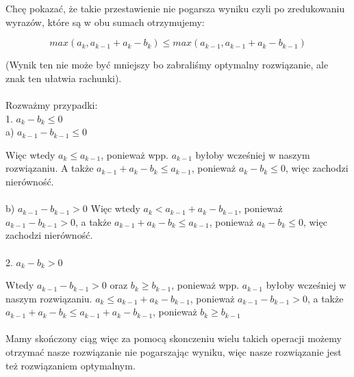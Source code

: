 \documentclass{article}
\begin{document}
Chcę pokazać, że takie przestawienie nie pogarsza wyniku czyli po zredukowaniu wyrazów, które są w obu sumach otrzymujemy:

$$ max(a_{k}, a_{k-1} + a_{k} - b_{k}) \leq max(a_{k-1}, a_{k-1} + a_{k} - b_{k-1}) $$

(Wynik ten nie może być mniejszy bo zabraliśmy optymalny rozwiązanie, ale znak ten ułatwia rachunki).\\ \\
Rozważmy przypadki:\\
1. $a_{k} - b_{k} \leq 0$ \\

a) $a_{k-1} - b_{k-1} \leq 0$

    Więc wtedy $a_{k} \leq a_{k-1}$, ponieważ wpp. $a_{k-1}$ byłoby wcześniej w naszym rozwiązaniu. A także $a_{k-1} + a_{k} - b_{k} \leq a_{k-1}$, ponieważ $a_{k} - b_{k} \leq 0$, więc zachodzi nierówność. \\ \\
    
b) $a_{k-1} - b_{k-1} > 0$
    Więc wtedy $a_{k} <  a_{k-1} + a_{k} - b_{k-1}$, ponieważ $a_{k-1} - b_{k-1} > 0$, a także $a_{k-1} + a_{k} - b_{k} \leq a_{k-1}$, ponieważ $a_{k} - b_{k} \leq 0$, więc zachodzi nierówność.
\\ \\
2. $a_{k} - b_{k} > 0$


    Wtedy $a_{k-1} - b_{k-1} > 0$ oraz $b_{k} \geq b_{k-1}$, ponieważ wpp. $a_{k-1}$ byłoby wcześniej w naszym rozwiązaniu. $a_{k} \leq a_{k-1} + a_{k} - b_{k-1}$, ponieważ $a_{k-1} - b_{k-1} > 0$, a także $a_{k-1} + a_{k} - b_{k} \leq a_{k-1} + a_{k} - b_{k-1}$, ponieważ $b_{k} \geq b_{k-1}$
\\ \\
Mamy skończony ciąg więc za pomocą skonczeniu wielu takich operacji możemy otrzymać nasze rozwiązanie nie pogarszając wyniku, więc nasze rozwiązanie jest też rozwiązaniem optymalnym.
\end{document}
